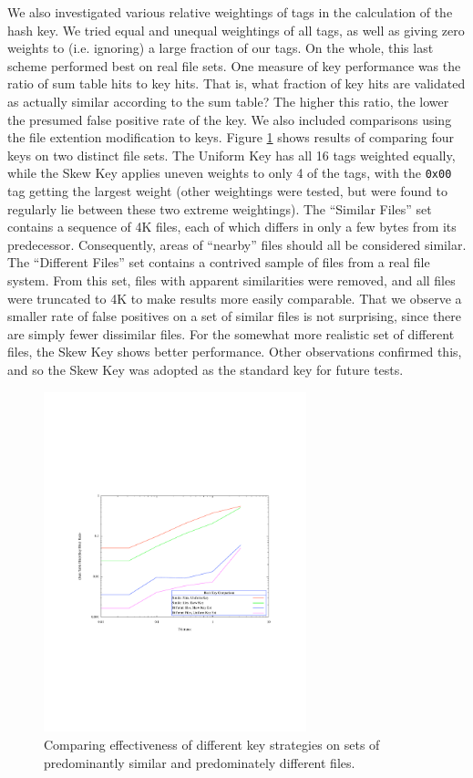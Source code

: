 \documentclass[10pt, twocolumn]{article}
\begin{document}
We also investigated various relative weightings of tags in the calculation of the hash key.  We tried equal and unequal weightings of all tags, as well as giving zero weights to (i.e. ignoring) a large fraction of our tags.  On the whole, this last scheme performed best on real file sets. One measure of key performance was the ratio of  sum table hits to key hits.  That is, what fraction of key hits are validated as actually similar according to the sum table?  The higher this ratio, the lower the presumed false positive rate of the key.  We also included comparisons using the file extention modification to keys.  Figure \ref{simdiff} shows results of comparing four keys on two distinct file sets.  The Uniform Key has all 16 tags weighted equally, while the Skew Key applies uneven weights to only 4 of the tags, with the {\tt 0x00} tag getting the largest weight (other weightings were tested, but were found to regularly lie between these two extreme weightings).  The ``Similar Files'' set contains a sequence of 4K files, each of which differs in only a few bytes from its predecessor.  Consequently, areas of ``nearby'' files should all be considered similar.  The ``Different Files'' set contains a contrived sample of files from a real file system.  From this set, files with apparent similarities were removed, and all files were truncated to 4K to make results more easily comparable.  That we observe a smaller rate of false positives on a set of similar files is not surprising, since there are simply fewer dissimilar files.  For the somewhat more realistic set of different files, the Skew Key shows better performance.  Other observations confirmed this, and so the Skew Key was adopted as the standard key for future tests.

 \begin{figure}[t] 
 \centering
\includegraphics[width= 3in]{ratioSimDiff.pdf}
\caption{Comparing effectiveness of different key strategies on sets of predominantly similar and predominately different files.}
\label{simdiff} 
\end{figure}   
\end{document}
